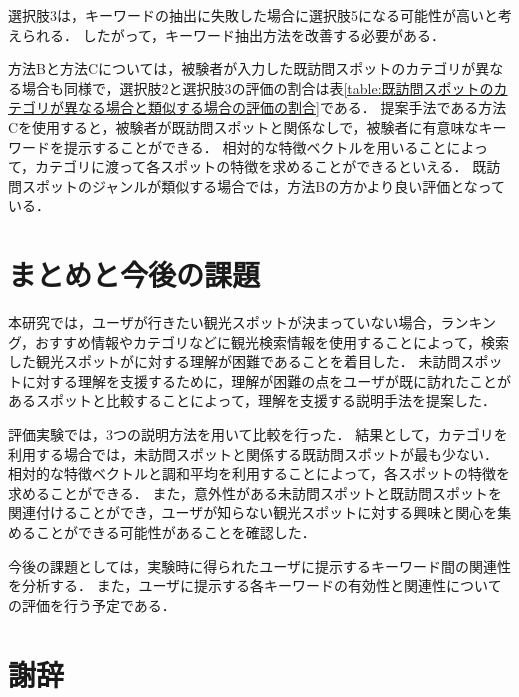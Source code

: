 \documentclass{deimj}
\begin{document}
選択肢3は，キーワードの抽出に失敗した場合に選択肢5になる可能性が高いと考えられる．
したがって，キーワード抽出方法を改善する必要がある．

方法Bと方法Cについては，被験者が入力した既訪問スポットのカテゴリが異なる場合も同様で，選択肢2と選択肢3の評価の割合は表\ref{table:既訪問スポットのカテゴリが異なる場合と類似する場合の評価の割合}である．
提案手法である方法Cを使用すると，被験者が既訪問スポットと関係なしで，被験者に有意味なキーワードを提示することができる．
相対的な特徴ベクトルを用いることによって，カテゴリに渡って各スポットの特徴を求めることができるといえる．
既訪問スポットのジャンルが類似する場合では，方法Bの方かより良い評価となっている．

\section{まとめと今後の課題}
\label{sec:まとめと今後の課題}

本研究では，ユーザが行きたい観光スポットが決まっていない場合，ランキング，おすすめ情報やカテゴリなどに観光検索情報を使用することによって，検索した観光スポットがに対する理解が困難であることを着目した．
未訪問スポットに対する理解を支援するために，理解が困難の点をユーザが既に訪れたことがあるスポットと比較することによって，理解を支援する説明手法を提案した．

評価実験では，3つの説明方法を用いて比較を行った．
結果として，カテゴリを利用する場合では，未訪問スポットと関係する既訪問スポットが最も少ない．
相対的な特徴ベクトルと調和平均を利用することによって，各スポットの特徴を求めることができる．
また，意外性がある未訪問スポットと既訪問スポットを関連付けることができ，ユーザが知らない観光スポットに対する興味と関心を集めることができる可能性があることを確認した．

今後の課題としては，実験時に得られたユーザに提示するキーワード間の関連性を分析する．
また，ユーザに提示する各キーワードの有効性と関連性についての評価を行う予定である．

\section*{謝辞}
\end{document}
